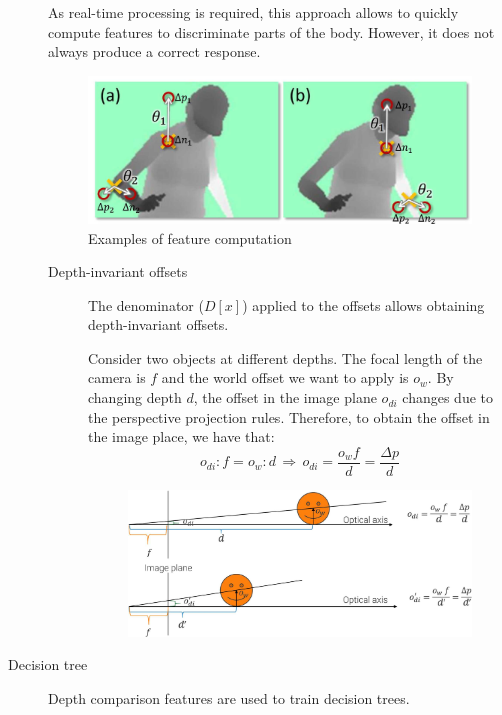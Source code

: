 \begin{description}
        \begin{remark}
            As real-time processing is required, this approach allows to quickly compute features to discriminate parts of the body. However, it does not always produce a correct response.
        \end{remark}

        \begin{figure}[H]
            \centering
            \includegraphics[width=0.6\linewidth]{./img/_depth_comparison_features.jpg}
            \caption{Examples of feature computation}
        \end{figure}

        \begin{description}
            \item[Depth-invariant offsets]
                The denominator ($D[x]$) applied to the offsets allows obtaining depth-invariant offsets.

                Consider two objects at different depths. The focal length of the camera is $f$ and the world offset we want to apply is $o_w$. By changing depth $d$, the offset in the image plane $o_{di}$ changes due to the perspective projection rules. Therefore, to obtain the offset in the image place, we have that:
                \[ o_{di} : f = o_w : d \,\Rightarrow\, o_{di} = \frac{o_w f}{d} = \frac{\Delta p}{d} \]

                \begin{figure}[H]
                    \centering
                    \includegraphics[width=0.6\linewidth]{./img/_depth_invariant_offset.jpg}
                \end{figure}
        \end{description}

    \item[Decision tree] 
        Depth comparison features are used to train decision trees.


\end{description}
